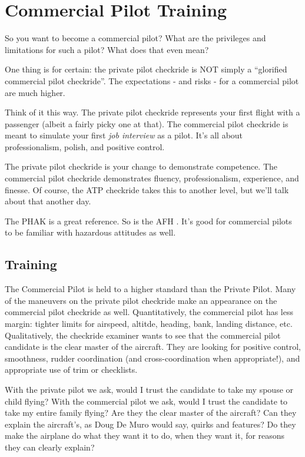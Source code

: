 \chapter{Commercial Pilot Training}

So you want to become a commercial pilot? What are the privileges and limitations for such a pilot? What does that even mean?

One thing is for certain: the private pilot checkride is NOT simply a ``glorified commercial pilot checkride''. The expectations - and risks - for a commercial pilot are much higher.

Think of it this way. The private pilot checkride represents your first flight with a passenger (albeit a fairly picky one at that). The commercial pilot checkride is meant to simulate your first \emph{job interview} as a pilot. It's all about professionalism, polish, and positive control.

The private pilot checkride is your change to demonstrate competence. The commercial pilot checkride demonstrates fluency, professionalism, experience, and finesse. Of course, the ATP checkride takes this to another level, but we'll talk about that another day.

The PHAK \cite{PHAK} is a great reference. So is the AFH \cite{AFH}. It's good for commercial pilots to be familiar with hazardous attitudes \cite{adm} as well.

\section{Training}

The Commercial Pilot is held to a higher standard than the Private Pilot. Many of the maneuvers on the private pilot checkride make an appearance on the commercial pilot checkride as well. Quantitatively, the commercial pilot has less margin: tighter limits for airspeed, altitde, heading, bank, landing distance, etc. Qualitatively, the checkride examiner wants to see that the commercial pilot candidate is the clear master of the aircraft. They are looking for positive control, smoothness, rudder coordination (and cross-coordination when appropriate!), and appropriate use of trim or checklists.

With the private pilot we ask, would I trust the candidate to take my spouse or child flying? With the commercial pilot we ask, would I trust the candidate to take my entire family flying? Are they the clear master of the aircraft? Can they explain the aircraft's, as Doug De Muro would say, quirks and features? Do they make the airplane do what they want it to do, when they want it, for reasons they can clearly explain?

